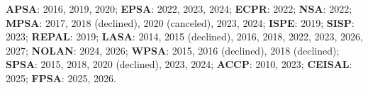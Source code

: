 {\bf APSA}: 2016, 2019, 2020; 
{\bf EPSA}: 2022, 2023, 2024; 
{\bf ECPR}: 2022; 
{\bf NSA}: 2022; 
{\bf MPSA}: 2017, 2018 (declined), 2020 (canceled), 2023, 2024; 
{\bf ISPE}: 2019; 
{\bf SISP}: 2023; 
{\bf REPAL}: 2019; 
{\bf LASA}: 2014, 2015 (declined), 2016, 2018, 2022, 2023, 2026, 2027; 
{\bf NOLAN}: 2024, 2026; 
{\bf WPSA}: 2015, 2016 (declined), 2018 (declined); 
{\bf SPSA}: 2015, 2018, 2020 (declined), 2023, 2024; 
{\bf ACCP}: 2010, 2023; 
{\bf CEISAL}: 2025; 
{\bf FPSA}: 2025, 2026.